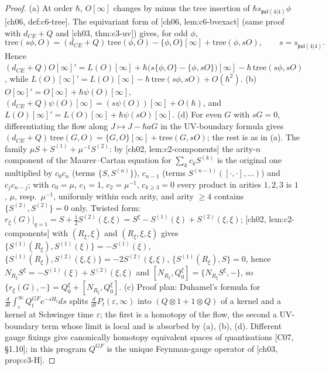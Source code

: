 \begin{proof}
(a) At order $\hbar$, $O[\infty]$ changes by minus the tree insertion of $\hbar s_{\mathfrak{psl}(4|4)}\phi$ [ch06, def:c6-tree]. The equivariant form of [ch06, lem:c6-bvexact] (same proof with $d_{CE}+Q$ and [ch03, thm:c3-uv]) gives, for odd $\phi$,
\[
\mathrm{tree}(s\phi,O)=(d_{CE}+Q)\,\mathrm{tree}(\phi,O)-\{\phi,O\}[\infty]+\mathrm{tree}(\phi,sO),\qquad s=s_{\mathfrak{psl}(4|4)} .
\]
Hence $(d_{CE}+Q)O[\infty]'=L(O)[\infty]+\hbar\big(s\{\phi,O\}-\{\phi,sO\}\big)[\infty]-\hbar\,\mathrm{tree}(s\phi,sO)$, while $L(O)[\infty]'=L(O)[\infty]-\hbar\,\mathrm{tree}(s\phi,sO)+O(\hbar^2)$. (b) $O[\infty]'=O[\infty]+\hbar\psi(O)[\infty]$, $(d_{CE}+Q)\psi(O)[\infty]=(s\psi(O))[\infty]+O(\hbar)$, and $L(O)[\infty]'=L(O)[\infty]+\hbar\psi(sO)[\infty]$. (d) For even $G$ with $sG=0$, differentiating the flow along $J\mapsto J-\hbar aG$ in the UV-boundary formula gives $(d_{CE}+Q)\,\mathrm{tree}(G,O)=\{G,O\}[\infty]+\mathrm{tree}(G,sO)$; the rest is as in (a). The family $\mu S+S^{(1)}+\mu^{-1}S^{(2)}$: by [ch02, lem:c2-components] the arity-$n$ component of the Maurer--Cartan equation for $\sum_kc_kS^{(k)}$ is the original one multiplied by $c_0c_n$ (terms $\{S,S^{(n)}\}$), $c_{n-1}$ (terms $S^{(n-1)}([\cdot,\cdot],\dots)$) and $c_jc_{n-j}$; with $c_0=\mu$, $c_1=1$, $c_2=\mu^{-1}$, $c_{k\ge3}=0$ every product in arities $1,2,3$ is $1$, $\mu$, resp.\ $\mu^{-1}$, uniformly within each arity, and arity $\ge4$ contains $\{S^{(2)},S^{(2)}\}=0$ only. Twisted form: $r_\xi(G)|_{q=1}=S+\tfrac12S^{(2)}(\xi,\xi)=S^\xi-S^{(1)}(\xi)+S^{(2)}(\xi,\xi)$; [ch02, lem:c2-components] with $(R_\xi,\xi)$ and $(R_\xi,\xi,\xi)$ gives $\{S^{(1)}(R_\xi),S^{(1)}(\xi)\}=-S^{(1)}(\xi)$, $\{S^{(1)}(R_\xi),S^{(2)}(\xi,\xi)\}=-2S^{(2)}(\xi,\xi)$, $\{S^{(1)}(R_\xi),S\}=0$, hence $N_{R_\xi}S^\xi=-S^{(1)}(\xi)+S^{(2)}(\xi,\xi)$ and $[N_{R_\xi},Q_0^\xi]=\{N_{R_\xi}S^\xi,-\}$, so $\{r_\xi(G),-\}=Q_0^\xi+[N_{R_\xi},Q_0^\xi]$. (c) Proof plan: Duhamel's formula for $\frac{d}{dt}\int_\varepsilon^\infty Q^{GF}_te^{-sH_t}ds$ splits $\frac{d}{dt}P_t(\varepsilon,\infty)$ into $(Q\otimes1+1\otimes Q)$ of a kernel and a kernel at Schwinger time $\varepsilon$; the first is a homotopy of the flow, the second a UV-boundary term whose limit is local and is absorbed by (a), (b), (d). Different gauge fixings give canonically homotopy equivalent spaces of quantisations [C07, §1.10]; in this program $Q^{GF}$ is the unique Feynman-gauge operator of [ch03, prop:c3-H].
\end{proof}


